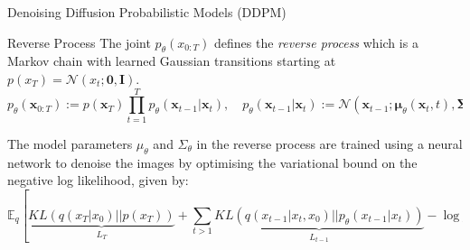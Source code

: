 \documentclass[final]{beamer}
\newlength{\colwidth}
\begin{document}
\begin{frame}[t]
\begin{columns}[t]
\begin{column}{\colwidth}
\begin{block}{Denoising Diffusion Probabilistic Models (DDPM)}
				\begin{infobox}{Reverse Process}
					The joint $p_\theta(x_{0:T})$ defines the \textit{reverse process} which is a Markov chain with learned Gaussian transitions starting at $p(x_{T}) = \mathcal{N}(x_{t}; \mathbf{0}, \mathbf{I})$.
					\begin{equation}
						p_{\theta}(\mathbf{x}_{0:T}) := p(\mathbf{x}_T) \prod_{t=1}^{T} p_{\theta}(\mathbf{x}_{t-1}|\mathbf{x}_t),
						\quad
						p_{\theta}(\mathbf{x}_{t-1}|\mathbf{x}_t) := \mathcal{N}(\mathbf{x}_{t-1}; \boldsymbol{\mu}_{\theta}(\mathbf{x}_t, t), \boldsymbol{\Sigma}_{\theta}(\mathbf{x}_t, t))
					\end{equation}
				\end{infobox}

			\end{block}

			The model parameters $\mu_\theta$ and $\Sigma_\theta$ in the reverse process are trained using a neural network to denoise the images by optimising the variational bound on the negative log likelihood, given by:
			\begin{equation}
				\mathbb{E}_q\left[\underbrace{KL(q(x_T\vert x_0) \vert\vert p(x_T))}_{L_T} + \sum_{t> 1}\underbrace{KL(q(x_{t-1}\vert x_t, x_0)\vert\vert p_{\theta}(x_{t-1}\vert x_t))}_{L_{t-1}} - \underbrace{\log p_{\theta}(x_0 \vert x_1)}_{L_0}\right] = L
			\label{eq:nll1}
			\end{equation}
			





\end{column}
\end{columns}
\end{frame}
\end{document}
